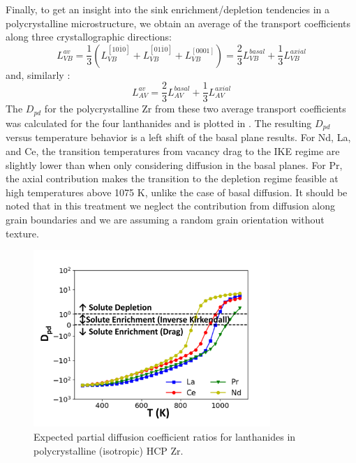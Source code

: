 \documentclass[preprint,12pt]{elsarticle}
\begin{document}
Finally, to get an insight into the sink enrichment/depletion tendencies in a polycrystalline microstructure, we obtain an average of the transport coefficients along three crystallographic directions:
\begin{equation}
   L_{VB}^{av} = \frac{1}{3} ( L_{VB}^{[1 0 \overline{1} 0] } +  L_{VB}^{[0 1 \overline{1} 0]} +   L_{VB}^{[0 0 0 1]}) = \frac{2}{3}  L_{VB}^{basal} + \frac{1}{3}  L_{VB}^{axial}
   \label{av_LVB}
\end{equation}
and, similarly :
\begin{equation}
    L_{AV}^{av} = \frac{2}{3}  L_{AV}^{basal} + \frac{1}{3}  L_{AV}^{axial}
    \label{av_LAV}
\end{equation}
The $D_{pd}$ for the polycrystalline Zr from these two average transport coefficients was calculated for the four lanthanides and is plotted in . The resulting $D_{pd}$ versus temperature behavior is a left shift of the basal plane results. For Nd, La, and Ce, the transition temperatures from vacancy drag to the IKE regime are slightly lower than when only considering diffusion in the basal planes. For Pr, the axial contribution makes the transition to the depletion regime feasible at high temperatures above 1075 K, unlike the case of basal diffusion. It should be noted that in this treatment we neglect the contribution from diffusion along grain boundaries and we are assuming a random grain orientation without texture.

\begin{figure}[h!]
    \centering
    \includegraphics[width=0.8\textwidth]{pdc_av_updated.jpg}
    \caption{Expected partial diffusion coefficient ratios for lanthanides in polycrystalline (isotropic) HCP Zr.}
    \label{fig:pdc_average}
\end{figure}
\end{document}

